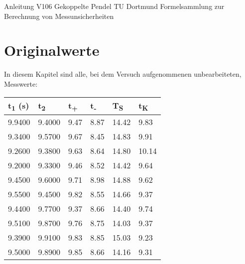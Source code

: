 \documentclass[titlepage=firstcover, captions=tableheading]{scrartcl}
\begin{document}
Anleitung V106 Gekoppelte Pendel TU Dortmund
Formelsammlung zur Berechnung von Messunsicherheiten

\section{Originalwerte}

In diesem Kapitel sind alle, bei dem Versuch aufgenommenen unbearbeiteten, Messwerte:

\begin{minipage}{\linewidth}
    \centering
{}
\begin{tabular}{llllll}
    \toprule
    t\textsubscript{1} (s) & t\textsubscript{2} & t\textsubscript{+} & t\textsubscript{-} & T\textsubscript{S} & t\textsubscript{K}\\
    \midrule
    9.9400 & 9.4000 & 9.47 & 8.87 & 14.42 & 9.83 \\
    9.3400 & 9.5700 & 9.67 & 8.45 & 14.83 & 9.91 \\
    9.2600 & 9.3800 & 9.63 & 8.64 & 14.80 & 10.14 \\
    9.2000 & 9.3300 & 9.46 & 8.52 & 14.42 & 9.64 \\
    9.4500 & 9.6000 & 9.71 & 8.98 & 14.88 & 9.62 \\
    9.5500 & 9.4500 & 9.82 & 8.55 & 14.66 & 9.37 \\
    9.4400 & 9.7700 & 9.37 & 8.66 & 14.40 & 9.74 \\
    9.5100 & 9.8700 & 9.76 & 8.75 & 14.03 & 9.37 \\
    9.3900 & 9.9100 & 9.83 & 8.85 & 15.03 & 9.23 \\
    9.5000 & 9.8900 & 9.85 & 8.66 & 14.16 & 9.31  \\
    \bottomrule
    
\end{tabular}
\end{minipage}
\end{document}
